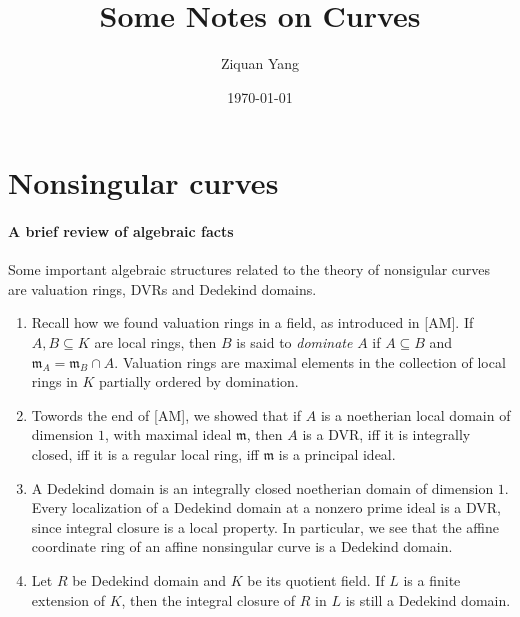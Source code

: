 \documentclass[12pt]{article}
\theoremstyle{plain}
\theoremstyle{definition}
\theoremstyle{named}
\newcommand{\fm}{\mathfrak{m}}
\newcommand{\<}{\langle}
\renewcommand{\>}{\rangle}
\begin{document}
%

\title{Some Notes on Curves}
\author{Ziquan Yang}


\date{\today}

\maketitle



\setcounter{section}{0}
\section{Nonsingular curves}
\paragraph{A brief review of algebraic facts}
Some important algebraic structures related to the theory of nonsigular curves are valuation rings, DVRs and Dedekind domains. 
\begin{enumerate}
\item Recall how we found valuation rings in a field, as introduced in [AM]. If $A, B \subseteq K$ are local rings, then $B$ is said to \textit{dominate} $A$ if $A \subseteq B$ and $\fm_A = \fm_B \cap A$. Valuation rings are maximal elements in the collection of local rings in $K$ partially ordered by domination.  

\item Towords the end of [AM], we showed that if $A$ is a noetherian local domain of dimension $1$, with maximal ideal $\fm$, then $A$ is a DVR, iff it is integrally closed, iff it is a regular local ring, iff $\fm$ is a principal ideal. 

\item A Dedekind domain is an integrally closed noetherian domain of dimension $1$. Every localization of a Dedekind domain at a nonzero prime ideal is a DVR, since integral closure is a local property. In particular, we see that the affine coordinate ring of an affine nonsingular curve is a Dedekind domain. 

\item Let $R$ be Dedekind domain and $K$ be its quotient field. If $L$ is a finite extension of $K$, then the integral closure of $R$ in $L$ is still a Dedekind domain. 
\end{enumerate}
\end{document}
